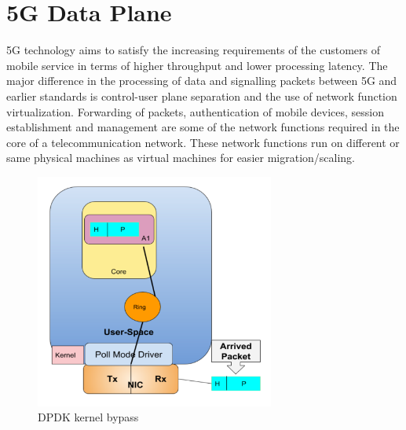 \section{5G Data Plane \label{sec:5GDataPlane}}
5G technology aims to satisfy the increasing requirements of the customers of mobile service 
in terms of higher throughput and lower processing latency. 
The major difference in  the processing of data and signalling packets between 5G and earlier standards is control-user plane 
separation and the use of network function virtualization. Forwarding of packets, 
authentication of mobile devices, session establishment and management  are some of the network functions required in the core of a telecommunication network. 
These network functions run on different or same physical machines as 
virtual machines for easier migration/scaling. 
\begin{figure}[htbp]
	\centering
       \includegraphics[width=0.7\textwidth]{fig/dpdkOverview.png}
       \setlength{\belowcaptionskip}{-12pt}
	\caption{DPDK kernel bypass}
	\label{fig:dpdkOverview}
       \end{figure}

